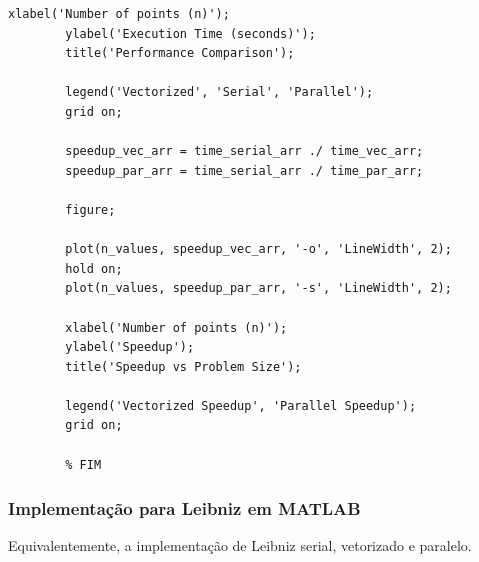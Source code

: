 \documentclass[12pt, a4paper]{article}
\begin{document}
\begin{lstlisting}[style=matlab, caption={pratica01.m}, label={lst:matlab}]
		xlabel('Number of points (n)');
		ylabel('Execution Time (seconds)');
		title('Performance Comparison');
		
		legend('Vectorized', 'Serial', 'Parallel');
		grid on;
		
		speedup_vec_arr = time_serial_arr ./ time_vec_arr;
		speedup_par_arr = time_serial_arr ./ time_par_arr;
		
		figure;
		
		plot(n_values, speedup_vec_arr, '-o', 'LineWidth', 2);
		hold on;
		plot(n_values, speedup_par_arr, '-s', 'LineWidth', 2);
		
		xlabel('Number of points (n)');
		ylabel('Speedup');
		title('Speedup vs Problem Size');
		
		legend('Vectorized Speedup', 'Parallel Speedup');
		grid on;
		
		% FIM
	\end{lstlisting}
	
	\subsubsection{Implementação para Leibniz em MATLAB}
	Equivalentemente, a implementação de Leibniz serial, vetorizado e paralelo.
	
\end{document}
